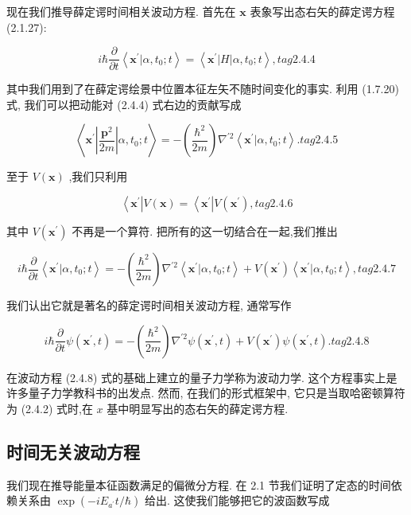 \documentclass[lang=cn,newtx,10pt,scheme=chinese,thmcnt=section]{elegantbook}
\begin{document}
现在我们推导薛定谔时间相关波动方程. 首先在 $\mathbf{x}$ 表象写出态右矢的薛定谔方程 (2.1.27):

$$
i\hbar \frac{\partial }{\partial t}\left\langle {{\mathbf{x}}^{\prime } | \alpha ,{t}_{0};t}\right\rangle = \left\langle {{\mathbf{x}}^{\prime }\left| H\right| \alpha ,{t}_{0};t}\right\rangle , tag{2.4.4}
$$

其中我们用到了在薛定谔绘景中位置本征左矢不随时间变化的事实. 利用 (1.7.20) 式, 我们可以把动能对 (2.4.4) 式右边的贡献写成

$$
\left\langle {{\mathbf{x}}^{\prime }\left| \frac{{\mathbf{p}}^{2}}{2m}\right| \alpha ,{t}_{0};t}\right\rangle = - \left( \frac{{\hbar }^{2}}{2m}\right) {\nabla }^{\prime 2}\left\langle {{\mathbf{x}}^{\prime } | \alpha ,{t}_{0};t}\right\rangle . tag{2.4.5}
$$

至于 $V\left( \mathbf{x}\right)$ ,我们只利用

$$
\left\langle {\mathbf{x}}^{\prime }\right| V\left( \mathbf{x}\right) = \left\langle {\mathbf{x}}^{\prime }\right| V\left( {\mathbf{x}}^{\prime }\right) , tag{2.4.6}
$$

其中 $V\left( {\mathbf{x}}^{\prime }\right)$ 不再是一个算符. 把所有的这一切结合在一起,我们推出

$$
i\hbar \frac{\partial }{\partial t}\left\langle {{\mathbf{x}}^{\prime } | \alpha ,{t}_{0};t}\right\rangle = - \left( \frac{{\hbar }^{2}}{2m}\right) {\nabla }^{\prime 2}\left\langle {{\mathbf{x}}^{\prime } | \alpha ,{t}_{0};t}\right\rangle + V\left( {\mathbf{x}}^{\prime }\right) \left\langle {{\mathbf{x}}^{\prime } | \alpha ,{t}_{0};t}\right\rangle , tag{2.4.7}
$$

我们认出它就是著名的薛定谔时间相关波动方程, 通常写作

$$
i\hbar \frac{\partial }{\partial t}\psi \left( {{\mathbf{x}}^{\prime }, t}\right) = - \left( \frac{{\hbar }^{2}}{2m}\right) {\nabla }^{\prime 2}\psi \left( {{\mathbf{x}}^{\prime }, t}\right) + V\left( {\mathbf{x}}^{\prime }\right) \psi \left( {{\mathbf{x}}^{\prime }, t}\right) . tag{2.4.8}
$$

在波动方程 (2.4.8) 式的基础上建立的量子力学称为波动力学. 这个方程事实上是许多量子力学教科书的出发点. 然而, 在我们的形式框架中, 它只是当取哈密顿算符为 (2.4.2) 式时,在 $x$ 基中明显写出的态右矢的薛定谔方程.

\subsection*{时间无关波动方程}
我们现在推导能量本征函数满足的偏微分方程. 在 2.1 节我们证明了定态的时间依赖关系由 $\exp \left( {-i{E}_{{a}^{\prime }}t/\hbar }\right)$ 给出. 这使我们能够把它的波函数写成
\end{document}
